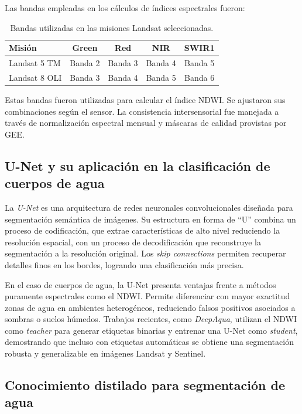 Las bandas empleadas en los cálculos de índices espectrales fueron:

\begin{table}[H]
\centering
\caption{Bandas utilizadas en las misiones Landsat seleccionadas.}
\label{tab:landsat_bandas}
\begin{tabular}{lcccc}
\toprule
Misión & Green & Red & NIR & SWIR1 \\
\midrule
Landsat 5 TM  & Banda 2 & Banda 3 & Banda 4 & Banda 5 \\
Landsat 8 OLI & Banda 3 & Banda 4 & Banda 5 & Banda 6 \\
\bottomrule
\end{tabular}
\end{table}



Estas bandas fueron utilizadas para calcular el índice NDWI. Se ajustaron sus combinaciones según el sensor. La consistencia intersensorial fue manejada a través de normalización espectral mensual y máscaras de calidad provistas por GEE.


\subsection{U-Net y su aplicación en la clasificación de cuerpos de agua}

La \textit{U-Net} es una arquitectura de redes neuronales convolucionales diseñada para
segmentación semántica de imágenes. Su estructura en forma de ``U'' combina un
proceso de codificación, que extrae características de alto nivel reduciendo la
resolución espacial, con un proceso de decodificación que reconstruye la
segmentación a la resolución original. Los \textit{skip connections} permiten
recuperar detalles finos en los bordes, logrando una clasificación más precisa.

En el caso de cuerpos de agua, la U-Net presenta ventajas frente a métodos
puramente espectrales como el NDWI. Permite diferenciar con mayor exactitud
zonas de agua en ambientes heterogéneos, reduciendo falsos positivos asociados
a sombras o suelos húmedos. Trabajos recientes, como \textit{DeepAqua}\cite{DeepAqua2023},
utilizan el NDWI como \textit{teacher} para generar etiquetas binarias y entrenar
una U-Net como \textit{student}, demostrando que incluso con etiquetas automáticas
se obtiene una segmentación robusta y generalizable en imágenes Landsat y Sentinel.


\subsection{Conocimiento distilado para segmentación de agua}

